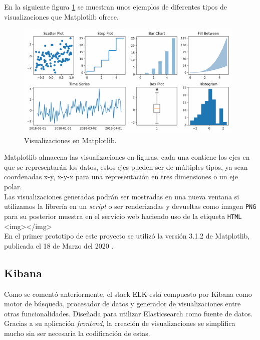 \documentclass[a4paper, 12pt]{book}
\begin{document}
		En la siguiente figura \ref{fig:visualizations_matplotlib} se muestran unos ejemplos de diferentes tipos de visualizaciones que Matplotlib ofrece.
		\begin{figure}[H]
			\centering
			\includegraphics[width=11cm, keepaspectratio]{img/visualizations_matplotlib.png}
			\caption{Visualizaciones en Matplotlib.}
			\label{fig:visualizations_matplotlib}
		\end{figure}
		
		Matplotlib almacena las visualizaciones en figuras, cada una contiene los ejes en que se representarán los datos, estos ejes pueden ser de múltiples tipos, ya sean coordenadas x-y, x-y-x para una representación en tres dimensiones o un eje polar.\\
		
		Las visualizaciones generadas podrán ser mostradas en una nueva ventana si utilizamos la librería en un \textit{script} o ser renderizadas y devueltas como imagen \texttt{PNG} para su posterior muestra en el servicio web haciendo uso de la etiqueta \texttt{HTML} <img></img>\\
		
		En el primer prototipo de este proyecto se utilizó la versión 3.1.2 de Matplotlib, publicada el 18 de Marzo del 2020 \cite{releases_matplotlib}.
		
	\subsection{Kibana}
	\label{subsec:kibana}
		Como se comentó anteriormente, el stack ELK está compuesto por Kibana \cite{kibana} como motor de búsqueda, procesador de datos y generador de visualizaciones entre otras funcionalidades. Diseñada para utilizar Elasticsearch como fuente de datos.\\
		
		Gracias a su aplicación \textit{frontend}, la creación de visualizaciones se simplifica mucho sin ser necesaria la codificación de estas. \\
		
\end{document}
